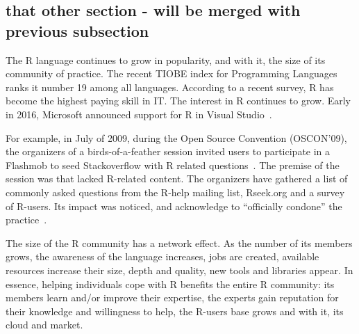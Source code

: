 \subsection{that other section - will be merged with previous subsection}


The R language continues to grow in popularity, and with it, the size of its community of practice. The recent TIOBE index for Programming Languages ranks it
number 19 among all languages.  According to a recent survey, R has become the highest paying skill in IT. The interest in R continues to grow.
Early in 2016, Microsoft announced support for R in Visual Studio~\cite{RMicrosoft2016}.

For example, in July of 2009, during the Open Source Convention (OSCON'09), the organizers of a birds-of-a-feather session invited users
to participate in a Flashmob to seed Stackoverflow with R related questions~\cite{OSCONRFlashMob2009}. The premise of the session was that \SO lacked R-related
content. The organizers have gathered a list of commonly asked questions from the R-help mailing list, Rseek.org and a survey of R-users. Its impact was
noticed, and \SO acknowledge to ``officially condone'' the practice~\cite{SOFlashMob2009}.

The size of the R community has a network effect. As the number of its members grows, the awareness of the language increases, jobs are created, available
resources increase their size, depth and quality, new tools and libraries appear. In essence, helping individuals cope with R benefits the entire R
community: its members learn and/or improve their expertise, the experts gain reputation for their knowledge and willingness to help, the R-users base grows and
with it, its cloud and market.


